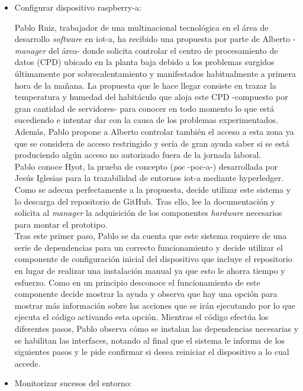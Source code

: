 \documentclass[12pt,a4paper, twoside]{report}
\begin{document}
	\begin{itemize}
		\item Configurar dispositivo \gls{raspberry-a}:
		
		Pablo Ruiz, trabajador de una multinacional tecnológica en el área de  desarrollo \textit{software} en \gls{iot-a}, ha recibido una propuesta por parte de Alberto -\textit{manager} del área- donde solicita controlar el centro de procesamiento de datos (CPD) ubicado en la planta baja debido a los problemas surgidos últimamente por sobrecalentamiento y manifestados habitualmente a primera hora de la mañana. La propuesta que le hace llegar consiste en trazar la temperatura y humedad del habitáculo que aloja este CPD -compuesto por gran cantidad de servidores- para conocer en todo momento lo que está sucediendo e intentar dar con la causa de los problemas experimentados. Además, Pablo propone a Alberto controlar también el acceso a esta zona ya que se considera de acceso restringido y sería de gran ayuda saber si se está produciendo algún acceso no autorizado fuera de la jornada laboral. \\
		
		Pablo conoce Hyot, la prueba de concepto (\textit{\gls{poc}} -\gls{poc-a}-) desarrollada por Jesús Iglesias para la trazabilidad de  entornos \gls{iot-a} mediante \gls{hyperledger}. Como se adecua perfectamente a la propuesta, decide utilizar este sistema y lo descarga del repositorio de GitHub. Tras ello, lee la documentación y solicita al \textit{manager} la adquisición de los componentes \textit{hardware} necesarios para montar el \gls{prototipo}. \\
		
		Tras este primer paso, Pablo se da cuenta que este sistema requiere de una serie de dependencias para un correcto funcionamiento y decide utilizar el componente de configuración inicial del dispositivo que incluye el repositorio en lugar de realizar una instalación manual ya que esto le ahorra tiempo y esfuerzo. Como en un principio desconoce el funcionamiento de este componente decide mostrar la ayuda y observa que hay una opción para mostrar más información sobre las acciones que se irán ejecutando por lo que ejecuta el código activando esta opción. Mientras el código efectúa los diferentes pasos, Pablo observa cómo se instalan las dependencias necesarias y se habilitan las interfaces, notando al final que el sistema le informa de los siguientes pasos y le pide confirmar si desea reiniciar el dispositivo a lo cual accede.
		
		\item Monitorizar sucesos del entorno:
		

\end{itemize}
\end{document}
